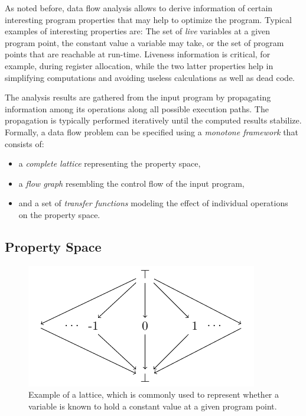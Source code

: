 As noted before, data flow analysis allows to derive information of certain
interesting program properties that may help to optimize the program. Typical
examples of interesting properties are: The set of \emph{live} variables at a
given program point, the constant value a variable may take, or the set of
program points that are reachable at run-time. Liveness information is critical,
for example, during register allocation, while the two latter properties help
in simplifying computations and avoiding useless calculations as well as dead
code.

The analysis results are gathered from the input program by propagating
information among its operations along all possible execution paths. The
propagation is typically performed iteratively until the computed results
stabilize. Formally, a data flow problem can be specified using a \emph{monotone
framework} that consists of:
\begin{itemize}
  \item a \emph{complete lattice} representing the property space,
  \item a \emph{flow graph} resembling the control flow of the input program,
  \item and a set of \emph{transfer functions} modeling the effect of individual
        operations \\ on the property space.
\end{itemize}

\subsection{Property Space}
\label{novillo:sec:property_space}

\begin{figure}[t]
  \begin{center}
    \includegraphics{constprop_lattice}
  \end{center}
  \vspace{-1em}
  \caption{Example of a lattice, which is commonly used to represent whether a
           variable is known to hold a constant value at a given program point.}
  \label{novillo:fig:lattice_constant_propagation}
\end{figure}

